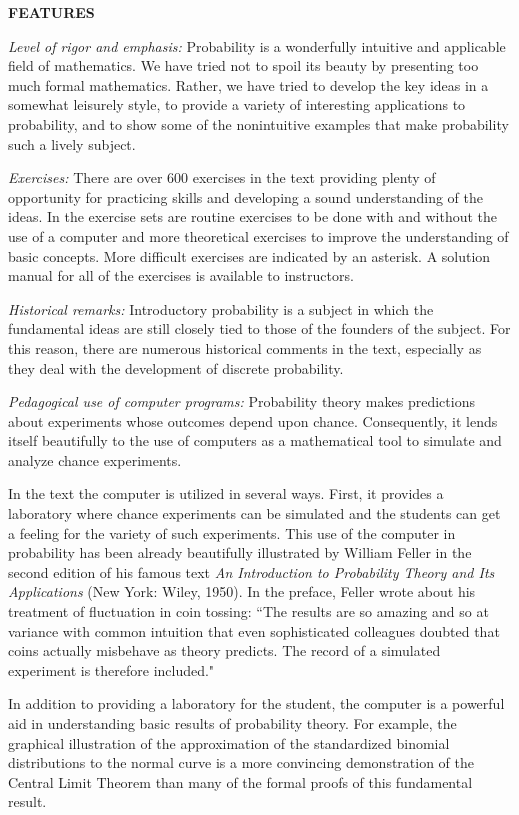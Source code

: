 \bigskip\centerline{\bf FEATURES}\medskip

{\it Level of rigor and emphasis:} Probability is a wonderfully intuitive and
applicable field of 
mathematics. We have tried not to spoil its beauty by presenting too much
formal mathematics. 
Rather, we have tried to develop the key ideas in a somewhat leisurely style,
to provide a variety 
of interesting applications to probability, and to show some of the
nonintuitive examples that 
make probability such a lively subject.

{\it Exercises:} There are over 600 exercises in the text providing plenty of
opportunity for practicing 
skills and developing a sound understanding of the ideas. In the exercise sets
are routine 
exercises to be done with and without the use of a computer and more
theoretical exercises to 
improve the understanding of basic concepts. More difficult exercises are
indicated by an 
asterisk.  A solution manual for all of the exercises is available to
instructors.

{\it Historical remarks:} Introductory probability is a subject in which the
fundamental ideas are still 
closely tied to those of the founders of the subject. For this reason, there
are numerous historical 
comments in the text, especially as they deal with the development of discrete
probability.

{\it Pedagogical use of computer programs:} Probability theory makes
predictions about experiments 
whose outcomes depend upon chance. Consequently, it lends itself beautifully to
the use of 
computers as a mathematical tool to simulate and analyze chance experiments.

In the text the computer is utilized in several ways. First, it provides a
laboratory where chance 
experiments can be simulated and the students can get a feeling for the variety
of such 
experiments. This use of the computer in probability has been already
beautifully illustrated by 
William Feller in the second edition of his famous text {\it An Introduction to
Probability Theory and Its 
Applications} (New York: Wiley, 1950). In the preface, Feller wrote about his
treatment of 
fluctuation in coin tossing: ``The results are so amazing and so at variance
with common intuition 
that even sophisticated colleagues doubted that coins actually misbehave as
theory predicts. The 
record of a simulated experiment is therefore included."

In addition to providing a laboratory for the student, the computer is a
powerful aid in 
understanding basic results of probability theory. For example, the graphical
illustration of the 
approximation of the standardized binomial distributions to the normal curve is
a
more convincing 
demonstration of the Central Limit Theorem than many of the formal proofs of
this fundamental 
result.

